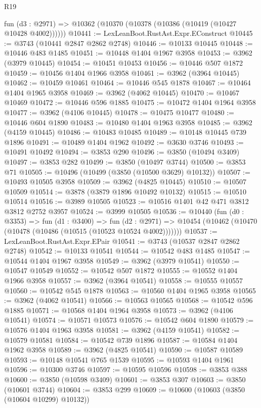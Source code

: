 \begin{lexlean}{R19}
\begin{coremodule}
    fun (d3 : @2971) => @10362 (@10370 (@10378 (@10386 (@10419 (@10427 @10428 @4002))))))
@10441 := LexLeanBoot.RustAst.Expr.EConstruct
@10445 := @3743 (@10441 @2847 @2862 @2748)
@10446 := @10133 @10445
@10448 := @10446 @483 @1485
@10451 := @10448 @1404 @1967 @3958
@10453 := @3962 (@3979 @10445)
@10454 := @10451 @10453
@10456 := @10446 @507 @1872
@10459 := @10456 @1404 @1966 @3958
@10461 := @3962 (@3964 @10445)
@10462 := @10459 @10461
@10464 := @10446 @545 @1878
@10467 := @10464 @1404 @1965 @3958
@10469 := @3962 (@4062 @10445)
@10470 := @10467 @10469
@10472 := @10446 @596 @1885
@10475 := @10472 @1404 @1964 @3958
@10477 := @3962 (@4106 @10445)
@10478 := @10475 @10477
@10480 := @10446 @604 @1890
@10483 := @10480 @1404 @1963 @3958
@10485 := @3962 (@4159 @10445)
@10486 := @10483 @10485
@10489 := @10148 @10445 @739 @1896
@10491 := @10489 @1404 @1962
@10492 := @3630 @3746
@10493 := @10491 @10492
@10494 := @3853 @290
@10496 := @3850 (@10494 @3409)
@10497 := @3853 @282
@10499 := @3850 (@10497 @3744)
@10500 := @3853 @71
@10505 := @10496 (@10499 (@3850 (@10500 @3629) @10132))
@10507 := @10493 @10505 @3958
@10509 := @3962 (@4825 @10445)
@10510 := @10507 @10509
@10514 := @3878 (@3879 @1896 @10492 @10132)
@10515 := @10510 @10514
@10516 := @3989 @10505
@10523 := @10516 @1401 @42 @471 @3812 @3812 @2752 @3957
@10524 := @3999 @10505
@10536 := @10440
    (fun (d0 : @3353) =>
    fun (d1 : @3400) =>
    fun (d2 : @2971) => @10454 (@10462 (@10470 (@10478 (@10486 (@10515 (@10523 @10524 @4002)))))))
@10537 := LexLeanBoot.RustAst.Expr.EPair
@10541 := @3743 (@10537 @2847 @2862 @2748)
@10542 := @10133 @10541
@10544 := @10542 @483 @1485
@10547 := @10544 @1404 @1967 @3958
@10549 := @3962 (@3979 @10541)
@10550 := @10547 @10549
@10552 := @10542 @507 @1872
@10555 := @10552 @1404 @1966 @3958
@10557 := @3962 (@3964 @10541)
@10558 := @10555 @10557
@10560 := @10542 @545 @1878
@10563 := @10560 @1404 @1965 @3958
@10565 := @3962 (@4062 @10541)
@10566 := @10563 @10565
@10568 := @10542 @596 @1885
@10571 := @10568 @1404 @1964 @3958
@10573 := @3962 (@4106 @10541)
@10574 := @10571 @10573
@10576 := @10542 @604 @1890
@10579 := @10576 @1404 @1963 @3958
@10581 := @3962 (@4159 @10541)
@10582 := @10579 @10581
@10584 := @10542 @739 @1896
@10587 := @10584 @1404 @1962 @3958
@10589 := @3962 (@4825 @10541)
@10590 := @10587 @10589
@10593 := @10148 @10541 @765 @1539
@10595 := @10593 @1404 @1961
@10596 := @10300 @3746
@10597 := @10595 @10596
@10598 := @3853 @388
@10600 := @3850 (@10598 @3409)
@10601 := @3853 @307
@10603 := @3850 (@10601 @3744)
@10604 := @3853 @299
@10609 := @10600 (@10603 (@3850 (@10604 @10299) @10132))

\end{coremodule}
\end{lexlean}
